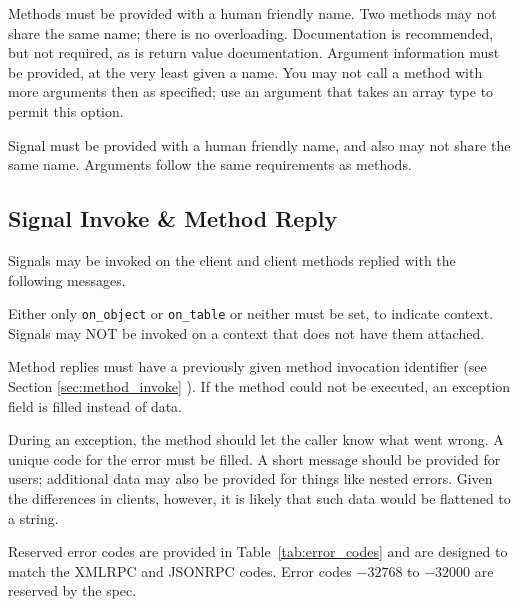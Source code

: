 \documentclass[11pt, oneside]{amsart}
\begin{document}
Methods must be provided with a human friendly name. Two methods may not share the same name; there is no overloading. Documentation is recommended, but not required, as is return value documentation. Argument information must be provided, at the very least given a name. You may not call a method with more arguments then as specified; use an argument that takes an array type to permit this option.

Signal must be provided with a human friendly name, and also may not share the same name. Arguments follow the same requirements as methods.

\subsection{Signal Invoke \& Method Reply}

Signals may be invoked on the client and client methods replied with the following messages.



Either only \texttt{on\_object} or \texttt{on\_table} or neither must be set, to indicate context. Signals may NOT be invoked on a context that does not have them attached.

Method replies must have a previously given method invocation identifier (see Section \ref{sec:method_invoke} ). If the method could not be executed, an exception field is filled instead of data. 

During an exception, the method should let the caller know what went wrong. A unique code for the error must be filled. A short message should be provided for users; additional data may also be provided for things like nested errors. Given the differences in clients, however, it is likely that such data would be flattened to a string.

Reserved error codes are provided in Table~\ref{tab:error_codes} and are designed to match the XMLRPC and JSONRPC codes. Error codes $-32768$ to $-32000$ are reserved by the spec.
\end{document}
